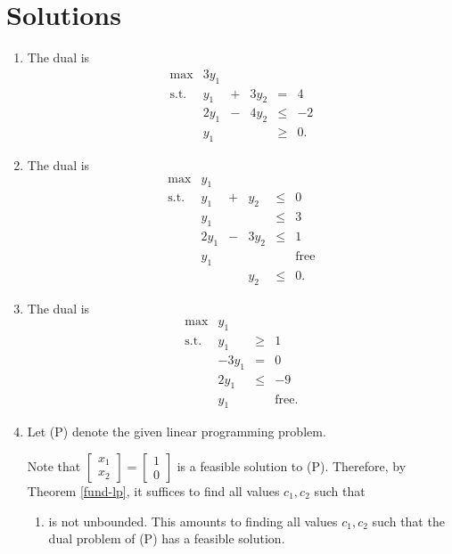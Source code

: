 \documentclass[]{book}
\providecommand{\tightlist}{%
  \setlength{\itemsep}{0pt}\setlength{\parskip}{0pt}}
\theoremstyle{definition}
\theoremstyle{definition}
\theoremstyle{remark}
\begin{document}
\section*{Solutions}\label{solutions-6}

\begin{enumerate}
\def\labelenumi{\arabic{enumi}.}
\item
  The dual is \[\begin{array}{rrcrcll}
  \max & 3y_1 \\
  \text{s.t.} 
  & y_1 & +  & 3y_2 & = & 4\\
  & 2y_1 & - & 4y_2 & \leq & -2 \\
  &  y_1 &   &      &\geq & 0.
  \end{array}\]
\item
  The dual is \[\begin{array}{rrcrcll}
  \max  & y_1  &   &   \\
  \mbox{s.t.}
   & y_1 & + &  y_2 & \leq & 0 \\
   & y_1 &   &      & \leq & 3 \\
   &2y_1 & - & 3y_2 & \leq & 1 \\
   & y_1 &   &      &      & \mbox{free} \\
   &     &   &  y_2 &  \leq & 0.
  \end{array}\]
\item
  The dual is \[\begin{array}{rrcll}
  \max  & y_1  \\
  \mbox{s.t.}
   &   y_1 & \geq & 1 \\
   & -3y_1 & = & 0 \\
   & 2y_1 & \leq & -9 \\
   & y_1 &    & \mbox{free}.
  \end{array}\]
\item
  Let (P) denote the given linear programming problem.

  Note that
  \(\begin{bmatrix} x_1 \\ x_2\end{bmatrix} = \begin{bmatrix} 1 \\ 0\end{bmatrix}\)
  is a feasible solution to (P). Therefore, by Theorem \ref{fund-lp}, it
  suffices to find all values \(c_1,c_2\) such that

  \begin{enumerate}
  \def\labelenumii{(\Alph{enumii})}
  \setcounter{enumii}{15}
  \tightlist
  \item
    is not unbounded. This amounts to finding all values \(c_1,c_2\)
    such that the dual problem of (P) has a feasible solution.
  \end{enumerate}


\end{enumerate}
\end{document}

